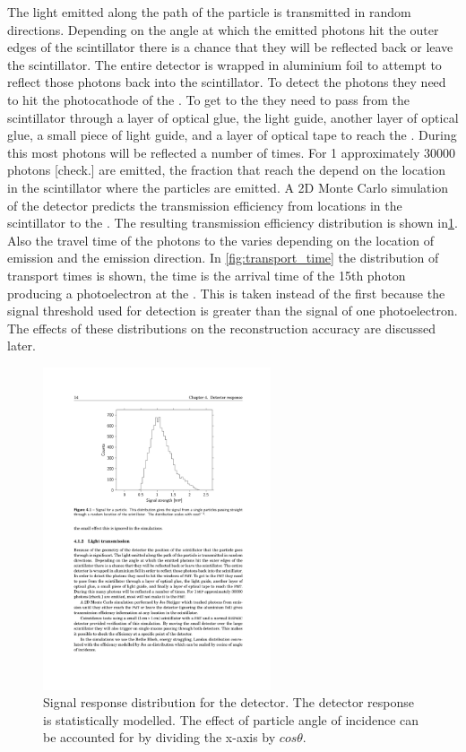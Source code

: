 The light emitted along the path of the particle is transmitted in random directions. Depending on the angle at which the emitted photons hit the outer edges of the scintillator there is a chance that they will be reflected back or leave the scintillator. The entire detector is wrapped in aluminium foil to attempt to reflect those photons back into the scintillator. To detect the photons they need to hit the photocathode of the \pmt. To get to the \pmt they need to pass from the scintillator through a layer of optical glue, the light guide, another layer of optical glue, a small piece of light guide, and a layer of optical tape to reach the \pmt. During this most photons will be reflected a number of times. For \SI{1}{\mip} approximately 30000 photons [check.] are emitted, the fraction that reach the \pmt depend on the location in the scintillator where the particles are emitted. A 2D Monte Carlo simulation of the detector predicts the transmission efficiency from locations in the scintillator to the \pmt \cite{steijger2010mc}. The resulting transmission efficiency distribution is shown in\cref{fig:signal_response}. Also the travel time of the photons to the \pmt varies depending on the location of emission and the emission direction. In \cref{fig:transport_time} the distribution of transport times is shown, the time is the arrival time of the 15th photon producing a photoelectron at the \pmt. This is taken instead of the first because the signal threshold used for detection is greater than the signal of one photoelectron. The effects of these distributions on the reconstruction accuracy are discussed later.

\begin{figure}
    \centering
    \includegraphics[width=0.6\textwidth]
                    {plots/station/signal_response}
    \caption{Signal response distribution for the detector. The detector response is statistically modelled. The effect of particle angle of incidence can be accounted for by dividing the x-axis by $cos \theta$.}
    \label{fig:signal_response}
\end{figure}

